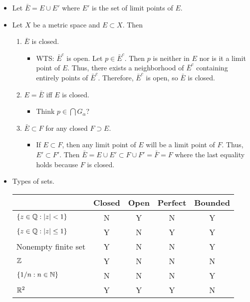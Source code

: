 \documentclass[../../notes.tex]{subfiles}
\begin{document}
\begin{itemize}
\begin{itemize}
    \end{itemize}
    \item Let $\bar{E}=E\cup E'$ where $E'$ is the set of limit points of $E$.
    \item Let $X$ be a metric space and $E\subset X$. Then
    \begin{enumerate}
        \item $\bar{E}$ is closed.
        \begin{itemize}
            \item WTS: $\bar{E}^c$ is open. Let $p\in\bar{E}^c$. Then $p$ is neither in $E$ nor is it a limit point of $E$. Thus, there exists a neighborhood of $\bar{E}^c$ containing entirely points of $\bar{E}^c$. Therefore, $\bar{E}^c$ is open, so $\bar{E}$ is closed.
        \end{itemize}
        \item $E=\bar{E}$ iff $E$ is closed.
        \begin{itemize}
            \item Think $p\in\bigcap G_\alpha$?
        \end{itemize}
        \item $\bar{E}\subset F$ for any closed $F\supset E$.
        \begin{itemize}
            \item If $E\subset F$, then any limit point of $E$ will be a limit point of $F$. Thus, $E'\subset F'$. Then $\bar{E}=E\cup E'\subset F\cup F'=\bar{F}=F$ where the last equality holds because $F$ is closed.
        \end{itemize}
    \end{enumerate}
    \item Types of sets.
    \begin{table}[h!]
        \centering
        \small
        \renewcommand{\arraystretch}{1.4}
        \begin{tabular}{l|c|c|c|c}
             & Closed & Open & Perfect & Bounded\\ \hline
            $\{z\in\mathbb{Q}:|z|<1\}$ & N & Y & N & Y\\ \hline
            $\{z\in\mathbb{Q}:|z|\leq 1\}$ & Y & N & Y & Y\\ \hline
            Nonempty finite set & Y & N & N & Y\\ \hline
            $\mathbb{Z}$ & Y & N & N & N\\ \hline
            $\{1/n:n\in\mathbb{N}\}$ & N & N & N & Y\\ \hline
            $\mathbb{R}^2$ & Y & Y & Y & N\\ \hline

\end{tabular}
\end{table}
\end{itemize}
\end{document}
